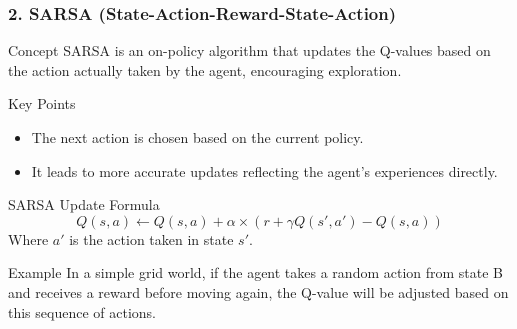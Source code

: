 \documentclass[aspectratio=169]{beamer}
\begin{document}
\begin{frame}[fragile]
    \frametitle{2. SARSA (State-Action-Reward-State-Action)}
    
    \begin{block}{Concept}
        SARSA is an on-policy algorithm that updates the Q-values based on the action actually taken by the agent, encouraging exploration.
    \end{block}
    
    \begin{block}{Key Points}
        \begin{itemize}
            \item The next action is chosen based on the current policy.
            \item It leads to more accurate updates reflecting the agent's experiences directly.
        \end{itemize}
    \end{block}
    
    \begin{block}{SARSA Update Formula}
        \begin{equation}
            Q(s, a) \leftarrow Q(s, a) + \alpha \times \left( r + \gamma Q(s', a') - Q(s, a) \right)
        \end{equation}
        Where \( a' \) is the action taken in state \( s' \).
    \end{block}
    
    \begin{block}{Example}
        In a simple grid world, if the agent takes a random action from state B and receives a reward before moving again, the Q-value will be adjusted based on this sequence of actions.
    \end{block}
\end{frame}
\end{document}
